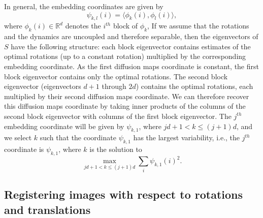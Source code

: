 \documentclass{pnastwo}
\begin{document}
\begin{article}
In general, the embedding coordinates are given by
\begin{equation} \label{eq:vdm_coord}
\psi_{k,l} (i) = \langle \phi_k(i), \phi_l(i) \rangle,
\end{equation}
where $\phi_k(i) \in \mathbb{R}^d$ denotes the $i^{th}$ block of $\phi_k$, 
%
If we assume that the rotations and the dynamics are uncoupled and therefore separable, then the eigenvectors of $S$ have the following structure: each block eigenvector contains estimates of the optimal rotations (up to a constant rotation) multiplied by the corresponding embedding coordinate.
%
As the first diffusion maps coordinate is constant, the first block eigenvector contains only the optimal rotations.
%
The second block eigenvector (eigenvectors $d+1$ through $2d$) contains the optimal rotations, each multiplied by their second diffusion maps coordinate. 
%
We can therefore recover this diffusion maps coordinate by taking inner products of the columns of the second block eigenvector with columns of the first block eigenvector.
%
The $j^{th}$ embedding coordinate will be given by $\psi_{k,1}$, where $jd +1 < k \le (j+1)d$,
and we select $k$ such that the coordinate $\psi_{k, 1}$ has the largest variability, i.e., the $j^{th}$ coordinate is $\psi_{k,1}$, where $k$ is the solution to
$$ \max_{jd +1 < k \le (j+1)d} \sum_i \psi_{k,1} (i)^2. $$

\subsection{Registering images with respect to rotations and translations} \label{subsec:trans_rot_register}


\end{article}
\end{document}

